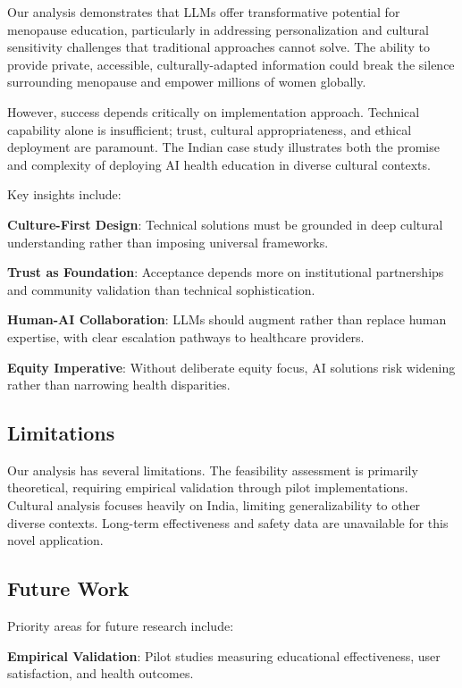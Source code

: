 \documentclass[letterpaper]{article} %
\begin{document}
Our analysis demonstrates that LLMs offer transformative potential for menopause education, particularly in addressing personalization and cultural sensitivity challenges that traditional approaches cannot solve. The ability to provide private, accessible, culturally-adapted information could break the silence surrounding menopause and empower millions of women globally.

However, success depends critically on implementation approach. Technical capability alone is insufficient; trust, cultural appropriateness, and ethical deployment are paramount. The Indian case study illustrates both the promise and complexity of deploying AI health education in diverse cultural contexts.

Key insights include:

\textbf{Culture-First Design}: Technical solutions must be grounded in deep cultural understanding rather than imposing universal frameworks.

\textbf{Trust as Foundation}: Acceptance depends more on institutional partnerships and community validation than technical sophistication.

\textbf{Human-AI Collaboration}: LLMs should augment rather than replace human expertise, with clear escalation pathways to healthcare providers.

\textbf{Equity Imperative}: Without deliberate equity focus, AI solutions risk widening rather than narrowing health disparities.

\subsection{Limitations}

Our analysis has several limitations. The feasibility assessment is primarily theoretical, requiring empirical validation through pilot implementations. Cultural analysis focuses heavily on India, limiting generalizability to other diverse contexts. Long-term effectiveness and safety data are unavailable for this novel application.

\subsection{Future Work}

Priority areas for future research include:

\textbf{Empirical Validation}: Pilot studies measuring educational effectiveness, user satisfaction, and health outcomes.
\end{document}

